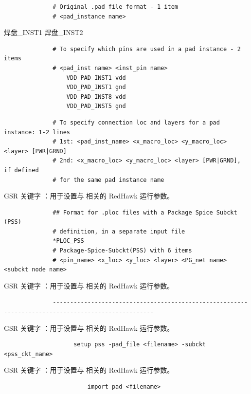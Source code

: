 \begin{lstlisting}
              # Original .pad file format - 1 item
              # <pad_instance name>
\end{lstlisting}

焊盘_INST1 焊盘_INST2

\begin{lstlisting}
              # To specify which pins are used in a pad instance - 2 items
              # <pad_inst name> <inst_pin name>
                  VDD_PAD_INST1 vdd
                  VDD_PAD_INST1 gnd
                  VDD_PAD_INST8 vdd
                  VDD_PAD_INST5 gnd
\end{lstlisting}

\begin{lstlisting}
              # To specify connection loc and layers for a pad instance: 1-2 lines
              # 1st: <pad_inst_name> <x_macro_loc> <y_macro_loc> <layer> [PWR|GRND]
              # 2nd: <x_macro_loc> <y_macro_loc> <layer> [PWR|GRND], if defined
              # for the same pad instance name
\end{lstlisting}

GSR 关键字 ：用于设置与  相关的 RedHawk 运行参数。

\begin{lstlisting}
              ## Format for .ploc files with a Package Spice Subckt (PSS)
              # definition, in a separate input file
              *PLOC_PSS
              # Package-Spice-Subckt(PSS) with 6 items
              # <pin_name> <x_loc> <y_loc> <layer> <PG_net name> <subckt node name>
\end{lstlisting}

GSR 关键字 ：用于设置与  相关的 RedHawk 运行参数。

\begin{lstlisting}
              ---------------------------------------------------------------------------------------------------
\end{lstlisting}

GSR 关键字 ：用于设置与  相关的 RedHawk 运行参数。

\begin{lstlisting}
                    setup pss -pad_file <filename> -subckt <pss_ckt_name>
\end{lstlisting}

GSR 关键字 ：用于设置与  相关的 RedHawk 运行参数。

\begin{lstlisting}
                        import pad <filename>
\end{lstlisting}

